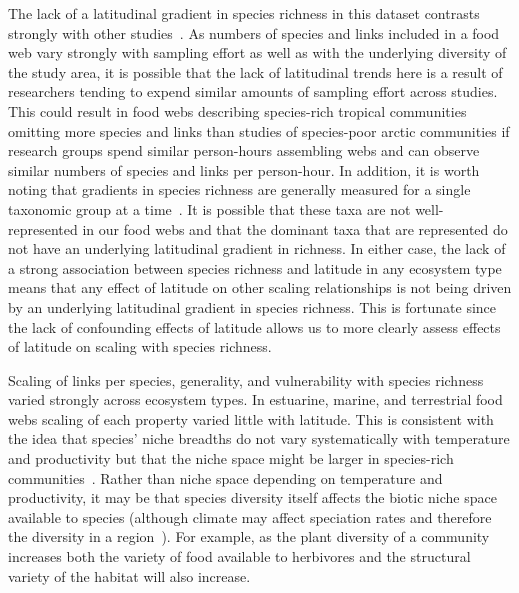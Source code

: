 \documentclass[12pt]{article}
\begin{document}
  The lack of a latitudinal gradient in species richness in this dataset
  contrasts strongly with other
  studies~\cite{Kaufman1995,Macpherson2002,Hillebrand2004,Schemske2009}. As
  numbers of species and links included in a food web vary strongly with
  sampling effort as well as with the underlying diversity of the study area,
  it is possible that the lack of latitudinal trends here is a result of
  researchers tending to expend similar amounts of sampling effort across
  studies. This could result in food webs describing species-rich tropical
  communities omitting more species and links than studies of species-poor
  arctic communities if research groups spend similar person-hours assembling
  webs and can observe similar numbers of species and links per person-hour.
  In addition, it is worth noting that gradients in species richness are
  generally measured for a single taxonomic group at a
  time~\cite{Kaufman1995,Macpherson2002,Hillebrand2004,Schemske2009}. It is
  possible that these taxa are not well-represented in our food webs and that
  the dominant taxa that are represented do not have an underlying latitudinal
  gradient in richness. In either case, the lack of a strong association
  between species richness and latitude in any ecosystem type means that any
  effect of latitude on other scaling relationships is not being driven by an
  underlying latitudinal gradient in species richness. This is fortunate since
  the lack of confounding effects of latitude allows us to more clearly assess
  effects of latitude on scaling with species richness.


  Scaling of links per species, generality, and vulnerability with species
  richness varied strongly across ecosystem types. In estuarine, marine, and
  terrestrial food webs scaling of each property varied little with latitude.
  This is consistent with the idea that species' niche breadths do not vary
  systematically with temperature and productivity but that the niche space
  might be larger in species-rich communities~\cite{Davies2007}. Rather than
  niche space depending on temperature and productivity, it may be that species
  diversity itself affects the biotic niche space available to species (although climate
  may affect speciation rates and therefore the diversity in a region~\cite{Currie2004}). 
  For example, as the plant diversity of a community increases both the 
  variety of food available to herbivores and the structural variety of the habitat will also increase.
\end{document}
